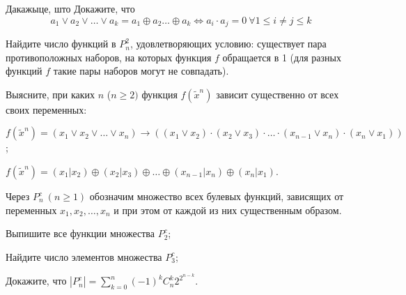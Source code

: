 \documentclass[12pt, a4paper]{article}
\begin{document}
\begin{problemList}
\smallskip

\problemItemWithCommonPart
{Дакажыце, што}
{Докажите, что \\[-30pt]}
{\[ a_1\vee a_2\vee \ldots \vee a_k = a_1\oplus a_2\ldots \oplus a_k \Leftrightarrow a_i\cdot a_j=0\ \forall 1 \le i \neq j \le k \]}

\medskip

{Найдите число функций в $P_n^2$, удовлетворяющих условию: существует пара противоположных наборов,
на которых функция $f$ обращается в 1 (для разных функций $f$ такие пары наборов могут не совпадать).}

\bigskip

{Выясните, при каких $n$ ($n\ge 2)$ функция $f(\tilde x^n)$ зависит существенно от всех своих переменных:}
{%
\begin{belarusianEnumerate}
    \item $f(\tilde x^n)=(x_1\vee x_2\vee\ldots\vee x_n)\rightarrow((x_1\vee x_2)\cdot (x_2\vee x_3)\cdot\ldots\cdot(x_{n-1}\vee x_n)\cdot(x_n\vee x_1))$;
    \item $f(\tilde x^n)=(x_1|x_2)\oplus(x_2|x_3)\oplus \ldots \oplus (x_{n-1}|x_n)\oplus(x_n|x_1)$.
\end{belarusianEnumerate}
}

\smallskip

{%
Через $P^c_n\ (n \ge 1)$ обозначим множество всех булевых функций, зависящих от переменных $x_1, x_2, \ldots, x_n$ и при этом от каждой из них существенным образом.
\begin{russianEnumerate}
    \item Выпишите все функции множества $P^c_2$;
    \item Найдите число элементов множества $P^c_3$;
    \item Докажите, что $|P^c_n|=\sum\limits_{k=0}^n (-1)^kC_n^k2^{2^{n-k}}$.
\end{russianEnumerate}
}

\end{problemList}
\end{document}
